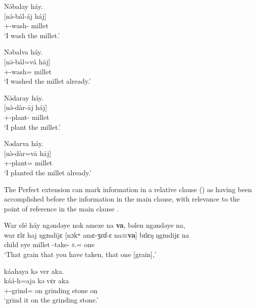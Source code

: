 \ea\label{ex:7:134}
N\'əbalay  háy.\\
\gll  {}[n\'ə-bál-áj   háj]\\
      {\oneS}+{\IFV}-wash-{\CL}  millet\\
\glt  ‘I wash the millet.’\\
\z 

\ea\label{ex:7:135}
Nəbalva  háy.\\
\gll  {}[n\=ə-bál=vá     h\={a}j]\\
      {\oneS}+{\PFV}-wash={\PRF}  millet\\
\glt  ‘I washed the millet already.’\\
\z 

\ea\label{ex:7:136}
 N\'ədaray  háy.\\
\gll  {}[n\'ə-dàr-\={a}j     háj]\\
      {\oneS}+{\IFV}-plant-{\CL}  millet\\
\glt  ‘I plant the millet.’\\
\z 

\ea\label{ex:7:137}
Nədarva  háy.\\
\gll  {}[n\`ə-dàr=v\={a}     h\={a}j]\\
      {\oneS}+{\PFV}-plant={\PRF}  millet\\
\glt  ‘I planted the millet already.’\\
\z 

The Perfect extension can mark information in a relative clause () as having been accomplished before the information in the main clause, with relevance to the point of reference in the main clause . 

\ea\label{ex:7:138}
War  elé  háy  ngəndəye  nok ameze  na  \textbf{va},  bəlen  ngəndəye  na,\\ 
\gll  war     ɛlɛ  haj      ŋgɪndijɛ   [nɔkʷ  amɛ-ʒɛɗ{}-ɛ na\textbf{=va}]  bɪlɛŋ  ŋgɪndijɛ na\\ 
      child  eye  millet {\DEM}  {\twoS}  {\DEP}-take-{\CL}   \textsc{s}.{\DO}={\PRF} one {\DEM} {\PSP}\\ 
\glt ‘That grain that you have taken, that one [grain],’
      
\medskip
 káahaya  kə  ver  aka.\\
\gll káá-h=aja kə vɛr aka\\
     {\twoS}+{\POT}-grind={\PLU}  on  {grinding stone}     on\\
\glt  ‘grind it on the grinding stone.’\\
\z 

